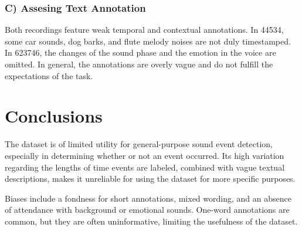 \documentclass[runningheads]{llncs}
\begin{document}
\subsubsection{C) Assesing Text Annotation}
Both recordings feature weak temporal and contextual annotations. In 44534, some car sounds, dog barks, and flute melody noises are not duly timestamped. In 623746, the changes of the sound phase and the emotion in the voice are omitted. In general, the annotations are overly vague and do not fulfill the expectations of the task.

\section{Conclusions} 
 The dataset is of limited utility for general-purpose sound event detection, especially in determining whether or not an event occurred. Its high variation regarding the lengths of time events are labeled, combined with vague textual descriptions, makes it unreliable for using the dataset for more specific purposes.

Biases include a fondness for short annotations, mixed wording, and an absence of attendance with background or emotional sounds. One-word annotations are common, but they are often uninformative, limiting the usefulness of the dataset.
\end{document}

